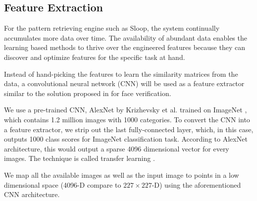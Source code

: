 \subsection{Feature Extraction} 

For the pattern retrieving engine such as Sloop, the system continually
accumulates more data over time. The availability of abundant data enables the
learning based methods to thrive over the engineered features because they can
discover and optimize features for the specific task at hand.

Instead of hand-picking the features to learn the similarity matrices from the
data, a convolutional neural network (CNN) will be used as a feature extractor
similar to the solution proposed in \cite{chopra05} for face verification.

We use a pre-trained CNN, AlexNet by Krizhevsky et al. \cite{kriz12} trained on
ImageNet \cite{imagenet}, which contains 1.2 million images with 1000
categories. To convert the CNN into a feature extractor, we strip out the last
fully-connected layer, which, in this case, outputs 1000 class scores for
ImageNet classification task. According to AlexNet architecture, this would
output a sparse 4096 dimensional vector for every images. The technique is
called transfer learning \cite{transfer}.

We map all the available images as well as the input image to points in a low
dimensional space (4096-D compare to $227 \times 227$-D) using the
aforementioned CNN architecture. 

